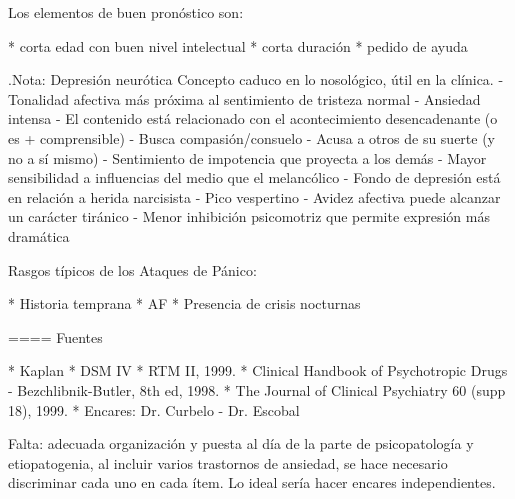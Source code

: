 \documentclass[encares.tex]{subfiles}
\begin{document}
Los elementos de buen pronóstico son:

* corta edad con buen nivel intelectual
* corta duración
* pedido de ayuda


.Nota: Depresión neurótica
Concepto caduco en lo nosológico, útil en la clínica.
- Tonalidad afectiva más próxima al sentimiento de tristeza normal
- Ansiedad intensa
- El contenido está relacionado con el acontecimiento desencadenante (o es + comprensible)
- Busca compasión/consuelo
- Acusa a otros de su suerte (y no a sí mismo)
- Sentimiento de impotencia que proyecta a los demás
- Mayor sensibilidad a influencias del medio que el melancólico
- Fondo de depresión está en relación a herida narcisista
- Pico vespertino
- Avidez afectiva puede alcanzar un carácter tiránico
- Menor inhibición psicomotriz que permite expresión más dramática

Rasgos típicos de los Ataques de Pánico:

* Historia temprana
* AF
* Presencia de crisis nocturnas

==== Fuentes

* Kaplan
* DSM IV
* RTM II, 1999.
* Clinical Handbook of Psychotropic Drugs - Bezchlibnik-Butler, 8th ed, 1998.
* The Journal of Clinical Psychiatry 60 (supp 18), 1999.
* Encares: Dr. Curbelo - Dr. Escobal

Falta: adecuada organización y puesta al día de la parte de psicopatología y etiopatogenia, al incluir varios trastornos de ansiedad, se hace necesario discriminar cada uno en cada ítem. Lo ideal sería hacer encares independientes.
\end{document}
